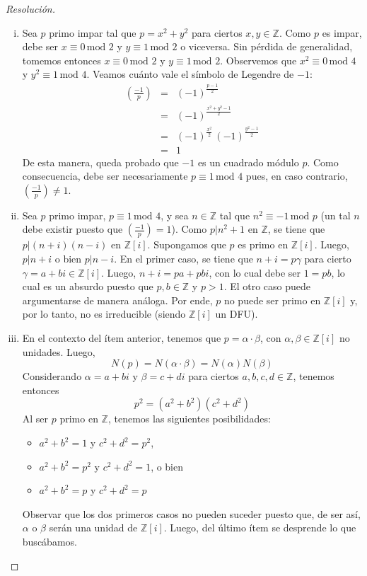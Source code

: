 \documentclass[a4paper,11pt]{article}
\newcommand{\ZZ}{\ensuremath{\mathbb{Z}}}
\newcommand{\Zm}[1]{\ensuremath{\mathbb{Z}[#1]}}
\newcommand{\Cong}[3]{\ensuremath{#1 \equiv #2 \, \textrm{mod } #3}}
\newcommand{\Div}[2]{\ensuremath{#1 | #2}}
\newcommand{\Leg}[2]{\left(\frac{#1}{#2}\right)}
\begin{document}
\begin{proof}[Resoluci\'on]
$ $

\begin{enumerate}[i.]

\item Sea $p$ primo impar tal que $p = x^2 + y^2$ para ciertos $x, y \in \ZZ$.
Como $p$ es impar,
debe ser \Cong{x}{0}{2} y \Cong{y}{1}{2} o viceversa. Sin pérdida de generalidad, tomemos
entonces \Cong{x}{0}{2} y \Cong{y}{1}{2}. Observemos que \Cong{x^2}{0}{4} y 
\Cong{y^2}{1}{4}. Veamos cuánto vale el símbolo de Legendre de $-1$:
\begin{eqnarray*}
    \Leg{-1}{p} &=& (-1)^{\frac{p-1}{2}} \\
                &=& (-1)^{\frac{x^2 + y^2 - 1}{2}} \\
                &=& (-1)^{\frac{x^2}{2}} \, (-1)^{\frac{y^2 - 1}{2}} \\
                &=& 1
\end{eqnarray*}
De esta manera, queda probado que $-1$ es un cuadrado módulo $p$. Como consecuencia, 
debe ser necesariamente \Cong{p}{1}{4} pues, en caso contrario, $\Leg{-1}{p} \neq 1$.

\item Sea $p$ primo impar, $\Cong{p}{1}{4}$, y sea $n \in \ZZ$ tal que 
$\Cong{n^2}{-1}{p}$ (un tal $n$ debe existir puesto que $\Leg{-1}{p} = 1$). Como
$\Div{p}{n^2 + 1}$ en \ZZ, se tiene que $\Div{p}{(n + i)(n - i)}$ en \Zm{i}.
Supongamos que $p$ es primo en \Zm{i}. Luego, $\Div{p}{n+i}$ o bien
$\Div{p}{n-i}$. En el primer caso, se tiene que $n + i = p \gamma$ para cierto
$\gamma = a + bi \in \Zm{i}$. Luego, $n + i = pa + pbi$, con lo cual debe ser
$1 = pb$, lo cual es un absurdo puesto que $p, b \in \ZZ$ y $p > 1$. El otro caso
puede argumentarse de manera análoga. Por ende, $p$ no puede ser primo en \Zm{i} y,
por lo tanto, no es irreducible (siendo \Zm{i} un DFU).

\item En el contexto del ítem anterior, tenemos que $p = \alpha \cdot \beta$, 
con $\alpha, \beta \in \Zm{i}$ no unidades. Luego,
$$N(p) = N(\alpha \cdot \beta) = N(\alpha) N(\beta)$$
Considerando $\alpha = a + bi$ y $\beta = c + di$ para ciertos $a,b,c,d \in \ZZ$,
tenemos entonces
$$p^2 = (a^2 + b^2) (c^2 + d^2)$$
Al ser $p$ primo en \ZZ, tenemos las siguientes posibilidades:
\begin{itemize}
    \item $a^2 + b^2 = 1$ y $c^2 + d^2 = p^2$,
    \item $a^2 + b^2 = p^2$ y $c^2 + d^2 = 1$, o bien
    \item $a^2 + b^2 = p$ y $c^2 + d^2 = p$
\end{itemize}
Observar que los dos primeros casos no pueden suceder puesto que, de ser así,
$\alpha$ o $\beta$ serán una unidad de \Zm{i}. Luego, del último ítem se 
desprende lo que buscábamos.

\end{enumerate}

\end{proof}
\end{document}
